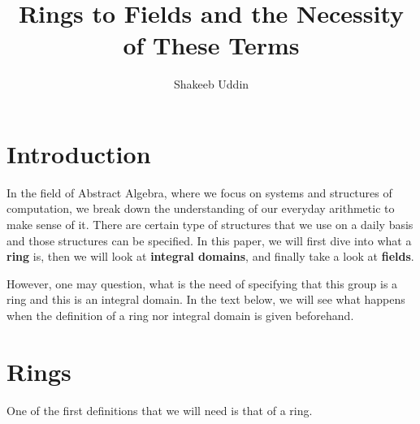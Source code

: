 \documentclass{article}
\title{Rings to Fields and the Necessity of These Terms}
\author{Shakeeb Uddin}\date{}
\begin{document}
\maketitle



\section*{Introduction}


In the field of Abstract Algebra, where we focus on systems and structures of computation, we break down the understanding of our everyday arithmetic to make sense of it. There are certain type of structures that we use on a daily basis and those structures can be specified. In this paper, we will first dive into what a \textbf{ring} is, then we will look at \textbf{integral domains}, and finally take a look at \textbf{fields}. 

However, one may question, what is the need of specifying that this group is a ring and this is an integral domain. In the text below, we will see what happens when the definition of a ring nor integral domain is given beforehand.

\section{Rings}

One of the first definitions that we will need is that of a ring.
\end{document}

